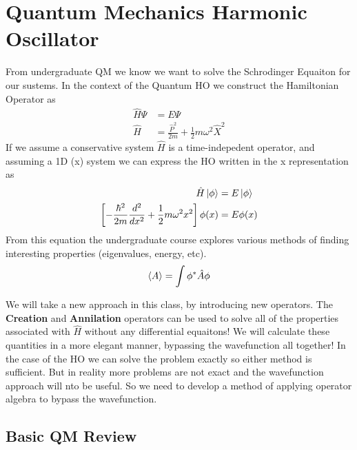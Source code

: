 \documentclass{article}
\newcommand{\be}{\begin{equation}}
\newcommand{\ee}{\end{equation}}
\begin{document}
\section*{Quantum Mechanics Harmonic Oscillator}
From undergraduate QM we know we want to solve the Schrodinger Equaiton for our sustems. 
In the context of the Quantum HO we construct the Hamiltonian Operator as
\be
\begin{split}
    \hat{H}\Psi &= E\Psi\\
    \hat{H} &= \frac{\hat{P}^2}{2m} + \frac{1}{2}m\omega^2 \hat{X}^2
\end{split}
\ee
If we assume a conservative system $\hat{H}$ is a time-indepedent operator, and assuming a 1D (x) system we can express the HO written in the x  representation as
\be
\begin{split}
    \hat{H}\ket{\phi} &= E\ket{\phi}\\
    \left[-\frac{\hbar^2}{2m} \frac{d^2}{dx^2} + \frac{1}{2}m\omega^2x^2\right]\phi(x) &= E\phi(x)
\end{split}
\ee
From this equation the undergraduate course explores various methods of finding interesting properties (eigenvalues, energy, etc). 
\be
\braket{A} = \int \phi^*\hat{A}\phi
\ee

We will take a new  approach in this class, by introducing new operators. 
The \textbf{Creation} and \textbf{Annilation} operators can be used to solve all of the properties associated with $\hat{H}$ without any differential equaitons!
We will calculate these quantities in a more elegant manner, bypassing the wavefunction all together!
In the case of the HO we can solve the problem exactly so either method is sufficient.
But in reality more problems are not exact and the wavefunction approach will nto be useful.
So we need to develop a method of applying operator algebra to bypass the wavefunction. 

\subsection*{Basic QM Review}
\end{document}
